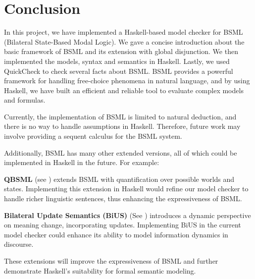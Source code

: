 \section{Conclusion}\label{sec:Conclusion}

In this project, we have implemented a Haskell-based model checker for BSML (Bilateral State-Based Modal Logic). We gave a concise introduction about the basic framework of BSML and its extension with global disjunction.
We then implemented the models, syntax and semantics in Haskell. Lastly, we used QuickCheck to check several facts about BSML.\@ 
BSML provides a powerful framework for handling free-choice phenomena in natural language, and by using Haskell, we have built an efficient and reliable tool to evaluate complex models and formulas.

Currently, the implementation of BSML is limited to natural deduction, and there is no way to handle assumptions in Haskell. 
Therefore, future work may involve providing a sequent calculus for the BSML system.

Additionally, BSML has many other extended versions, all of which could be implemented in Haskell in the future. For example:

\textbf{QBSML} (see \citet{Aloni2023}) extends BSML with quantification over possible worlds and states. Implementing this extension in Haskell would refine our model checker to handle richer linguistic sentences, thus enhancing the expressiveness of BSML.\@

\textbf{Bilateral Update Semantics (BiUS)} (See \citet{BiUS2023}) introduces a dynamic perspective on meaning change, incorporating updates. Implementing BiUS in the current model checker could enhance its ability to model information dynamics in discourse.

These extensions will improve the expressiveness of BSML and further demonstrate Haskell's suitability for formal semantic modeling.
